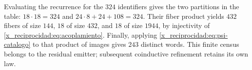 Evaluating the recurrence for the \(324\) identifiers gives the two
partitions in the table: \(18\cdot18=324\) and
\(24\cdot8+24+108=324\). Their fiber product yields \(432\) fibers of
size \(144\), \(18\) of size \(432\), and \(18\) of size \(1944\),
by injectivity of \eqref{x_reciprocidad:eq:acoplamiento}. Finally, applying
\eqref{x_reciprocidad:eq:psi-catalogo} to that product of images gives \(243\)
distinct words. This finite census belongs to the residual emitter;
subsequent coinductive refinement retains its own law.

